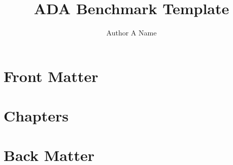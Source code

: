 \documentclass[11pt]{book}
\title{ADA Benchmark Template}
\author{Author A Name}
\begin{document}
\maketitle
\def\title#1{\chapter{#1}}
\tableofcontents

\part{Front Matter}
        
        
        
        
        
        
        
        
\part{Chapters}
        
        
        
        
        
        
\part{Back Matter}
        
        


\printbibliography[title={Bibliography}]
\end{document}
